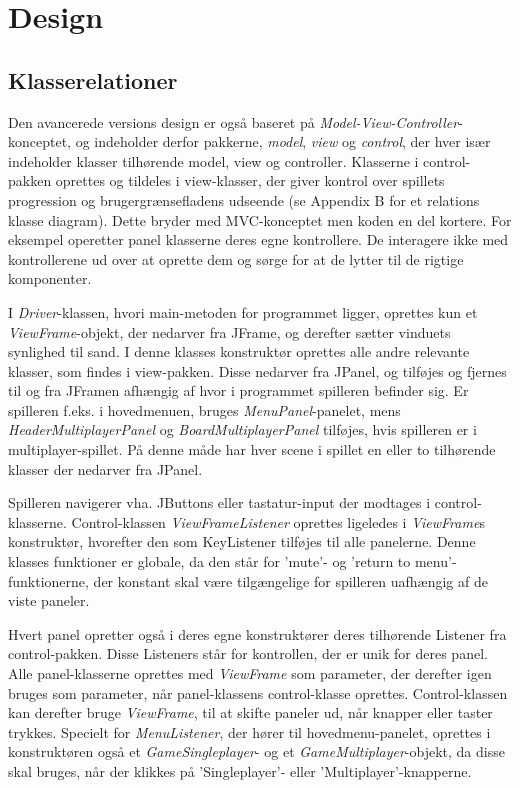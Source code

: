\section{Design}

\subsection{Klasserelationer}
Den avancerede versions design er også baseret på \textit{Model-View-Controller}-konceptet, og indeholder derfor pakkerne, \textit{model}, \textit{view} og \textit{control}, der hver især indeholder klasser tilhørende model, view og controller. Klasserne i control-pakken oprettes og tildeles i view-klasser, der giver kontrol over spillets progression og brugergrænsefladens udseende (se Appendix B for et relations klasse diagram). Dette bryder med MVC-konceptet men koden en del kortere. For eksempel operetter panel klasserne deres egne kontrollere. De interagere ikke med kontrollerene ud over at oprette dem og sørge for at de lytter til de rigtige komponenter.
\newline

I \textit{Driver}-klassen, hvori main-metoden for programmet ligger, oprettes kun et \textit{ViewFrame}-objekt, der nedarver fra JFrame, og derefter sætter vinduets synlighed til sand. I denne klasses konstruktør oprettes alle andre relevante klasser, som findes i view-pakken. Disse nedarver fra JPanel, og tilføjes og fjernes til og fra JFramen afhængig af hvor i programmet spilleren befinder sig. Er spilleren f.eks. i hovedmenuen, bruges \textit{MenuPanel}-panelet, mens \textit{HeaderMultiplayerPanel} og \textit{BoardMultiplayerPanel} tilføjes, hvis spilleren er i multiplayer-spillet. På denne måde har hver scene i spillet en eller to tilhørende klasser der nedarver fra JPanel.
\newline

Spilleren navigerer vha. JButtons eller tastatur-input der modtages i control-klasserne. Control-klassen \textit{ViewFrameListener} oprettes ligeledes i \textit{ViewFrame}s konstruktør, hvorefter den som KeyListener tilføjes til alle panelerne. Denne klasses funktioner er globale, da den står for 'mute'- og 'return to menu'-funktionerne, der konstant skal være tilgængelige for spilleren uafhængig af de viste paneler.
\newline

Hvert panel opretter også i deres egne konstruktører deres tilhørende Listener fra control-pakken. Disse Listeners står for kontrollen, der er unik for deres panel. Alle panel-klasserne oprettes med \textit{ViewFrame} som parameter, der derefter igen bruges som parameter, når panel-klassens control-klasse oprettes. Control-klassen kan derefter bruge \textit{ViewFrame}, til at skifte paneler ud, når knapper eller taster trykkes. Specielt for \textit{MenuListener}, der hører til hovedmenu-panelet, oprettes i konstruktøren også et \textit{GameSingleplayer}- og et \textit{GameMultiplayer}-objekt, da disse skal bruges, når der klikkes på 'Singleplayer'- eller 'Multiplayer'-knapperne. 
\newline


